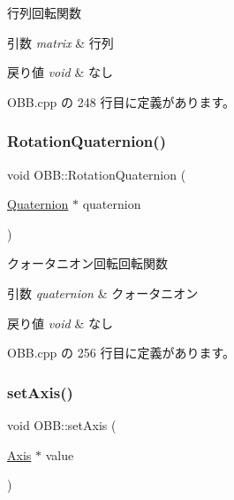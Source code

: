 行列回転関数 


\begin{DoxyParams}{引数}
{\em matrix} & 行列 \\
\hline
\end{DoxyParams}

\begin{DoxyRetVals}{戻り値}
{\em void} & なし \\
\hline
\end{DoxyRetVals}


 O\+B\+B.\+cpp の 248 行目に定義があります。

\mbox{\label{class_o_b_b_a1501af5476ba75dbc4a85b4746352326}} 
\subsubsection{\texorpdfstring{Rotation\+Quaternion()}{RotationQuaternion()}}
{\footnotesize\ttfamily void O\+B\+B\+::\+Rotation\+Quaternion (\begin{DoxyParamCaption}\item[{\mbox{\hyperlink{_vector3_d_8h_a3ee38c9c46d9851e33a9a1113328dafc}{Quaternion}} $\ast$}]{quaternion }\end{DoxyParamCaption})}



クォータニオン回転回転関数 


\begin{DoxyParams}{引数}
{\em quaternion} & クォータニオン \\
\hline
\end{DoxyParams}

\begin{DoxyRetVals}{戻り値}
{\em void} & なし \\
\hline
\end{DoxyRetVals}


 O\+B\+B.\+cpp の 256 行目に定義があります。

\mbox{\label{class_o_b_b_a72a04d773f08608f2cd3542f505dee94}} 
\subsubsection{\texorpdfstring{set\+Axis()}{setAxis()}}
{\footnotesize\ttfamily void O\+B\+B\+::set\+Axis (\begin{DoxyParamCaption}\item[{\mbox{\hyperlink{class_axis}{Axis}} $\ast$}]{value }\end{DoxyParamCaption})}



